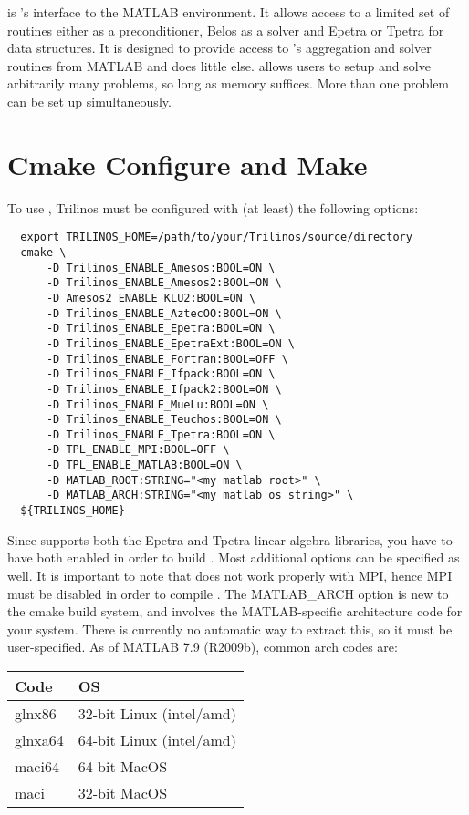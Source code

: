 \muemex is \muelu's interface to the MATLAB environment. It allows access
to a limited set of routines either \muelu as a preconditioner,
Belos as a solver and Epetra or Tpetra for data structures.
It is designed to provide access to \muelu's aggregation and
solver routines from MATLAB and does little else. \muemex allows users to
setup and solve arbitrarily many problems, so long as memory suffices.
More than one problem can be set up simultaneously.

\section{Cmake Configure and Make}\label{sec:muemex:cmake}
To use \muemex, Trilinos must be configured with (at least) the
following options:

\begin{lstlisting}
  export TRILINOS_HOME=/path/to/your/Trilinos/source/directory
  cmake \
      -D Trilinos_ENABLE_Amesos:BOOL=ON \
      -D Trilinos_ENABLE_Amesos2:BOOL=ON \
      -D Amesos2_ENABLE_KLU2:BOOL=ON \
      -D Trilinos_ENABLE_AztecOO:BOOL=ON \
      -D Trilinos_ENABLE_Epetra:BOOL=ON \
      -D Trilinos_ENABLE_EpetraExt:BOOL=ON \
      -D Trilinos_ENABLE_Fortran:BOOL=OFF \
      -D Trilinos_ENABLE_Ifpack:BOOL=ON \
      -D Trilinos_ENABLE_Ifpack2:BOOL=ON \
      -D Trilinos_ENABLE_MueLu:BOOL=ON \
      -D Trilinos_ENABLE_Teuchos:BOOL=ON \
      -D Trilinos_ENABLE_Tpetra:BOOL=ON \
      -D TPL_ENABLE_MPI:BOOL=OFF \
      -D TPL_ENABLE_MATLAB:BOOL=ON \
      -D MATLAB_ROOT:STRING="<my matlab root>" \
      -D MATLAB_ARCH:STRING="<my matlab os string>" \
  ${TRILINOS_HOME}
\end{lstlisting}

Since \muemex supports both the Epetra and Tpetra linear algebra
libraries, you have to have both enabled in order to build \muemex.
Most additional options can be specified as well.  It is important to
note that \muemex does not work properly with MPI, hence MPI must be
disabled in order to compile \muemex.  The MATLAB\_ARCH option is new to
the cmake build system, and involves the MATLAB-specific architecture
code for your system.  There is currently no automatic way to extract
this, so it must be user-specified.  As of MATLAB 7.9 (R2009b), common
arch codes are:
\begin{center}
\begin{tabular}{l|l}
Code& OS\\
\hline
glnx86& 32-bit Linux (intel/amd)\\
glnxa64& 64-bit Linux (intel/amd)\\
maci64& 64-bit MacOS\\
maci& 32-bit MacOS\\
\end{tabular}
\end{center}

